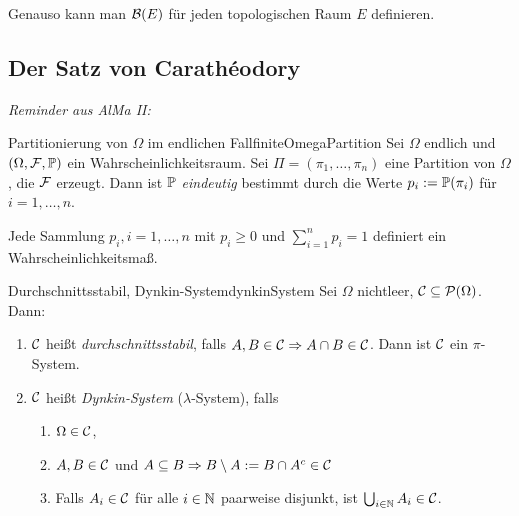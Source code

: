 \documentclass[language=ngerman]{../../Template/TemplateLecture}
\begin{document}
\begin{bemerkung}
    Genauso kann man $\mathcal{B}(E)$ für jeden topologischen Raum $E$ definieren.
\end{bemerkung}

\subsection{Der Satz von Carathéodory}
\emph{Reminder aus AlMa II:}

\begin{lem}{Partitionierung von $\Omega$ im endlichen Fall}{finiteOmegaPartition}
    Sei $\Omega$ endlich und $(\Omega, \mathcal{F}, \mathbb{P})$ ein Wahrscheinlichkeitsraum. Sei $\Pi = (\pi_1, \ldots, \pi_n)$ eine Partition von $\Omega$, die $\mathcal{F}$ erzeugt. Dann ist $\mathbb{P}$ \emph{eindeutig} bestimmt durch die Werte $p_i :=  \mathbb{P}(\pi_i)$ für $i = 1,\ldots,n$. 

    Jede Sammlung $p_i, i = 1,\ldots,n$ mit $p_i \geq 0$ und $\sum_{i = 1}^n p_i = 1$ definiert ein Wahrscheinlichkeitsmaß.
\end{lem}


\begin{defi}{Durchschnittsstabil, Dynkin-System}{dynkinSystem}
    Sei $\Omega$ nichtleer, $\mathcal{C} \subseteq \mathcal{P}(\Omega)$. Dann:
    \begin{enumerate}[$(i)$]
        \item $\mathcal{C}$ heißt \emph{durchschnittsstabil}, falls $A, B \in \mathcal{C} \Rightarrow A \cap B \in \mathcal{C}$. Dann ist $\mathcal{C}$ ein $\pi$-System.
        \item $\mathcal{C}$ heißt \emph{Dynkin-System} ($\lambda$-System), falls 
        \begin{enumerate}[(\greek*)]
            \item $\Omega \in \mathcal{C}$,
            \item $A, B \in \mathcal{C}$ und $A \subseteq B \Rightarrow B \setminus A := B \cap A^c \in \mathcal{C}$
            \item Falls $A_i \in \mathcal{C}$ für alle $i \in \mathbb{N}$ paarweise disjunkt, ist $\bigcup_{i \in \mathbb{N}} A_i \in \mathcal{C}$.
        \end{enumerate}
    \end{enumerate} 
\end{defi}
\end{document}
